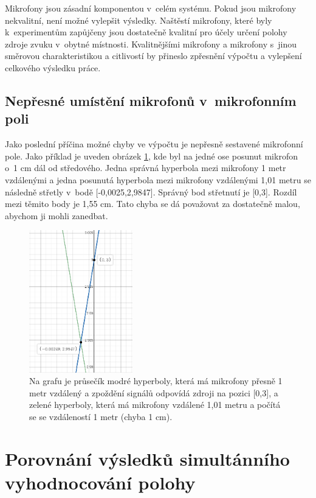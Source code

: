 Mikrofony jsou zásadní komponentou v~celém systému. Pokud jsou mikrofony nekvalitní, není možné vylepšit výsledky. Naštěstí mikrofony, které byly k~experimentům zapůjčeny jsou dostatečně kvalitní pro účely určení polohy zdroje zvuku v~obytné místnosti. Kvalitnějšími mikrofony a mikrofony s~jinou směrovou charakteristikou a citlivostí by přineslo zpřesnění výpočtu a vylepšení celkového výsledku práce.

\subsection{Nepřesné umístění mikrofonů v~mikrofonním poli}

Jako poslední příčina možné chyby ve výpočtu je nepřesně sestavené mikrofonní pole. Jako příklad je uveden obrázek \ref{pic:mikrofon_posun}, kde byl na jedné ose posunut mikrofon o~1 cm dál od středového. Jedna správná hyperbola mezi mikrofony 1 metr vzdálenými a jedna posunutá hyperbola mezi mikrofony vzdálenými 1,01 metru se následně střetly v~bodě [-0,0025,2,9847]. Správný bod střetnutí je [0,3]. Rozdíl mezi těmito body je 1,55 cm. Tato chyba se dá považovat za dostatečně malou, abychom ji mohli zanedbat.

\begin{figure}[hbt]
	\centering
	\includegraphics[width=0.4\textwidth]{obrazky-figures/nepresne_mik_pole.png}
	\caption{Na grafu je průsečík modré hyperboly, která má mikrofony přesně 1 metr vzdálený a zpoždění signálů odpovídá zdroji na pozici [0,3], a zelené hyperboly, která má mikrofony vzdálené 1,01 metru a počítá se se vzdáleností 1 metr (chyba 1 cm).}
	\label{pic:mikrofon_posun}
\end{figure}

\section{Porovnání výsledků simultánního vyhodnocování polohy}

